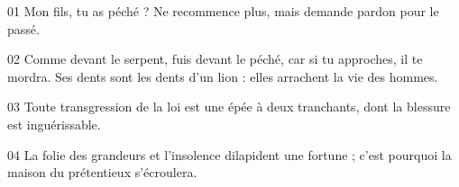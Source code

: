 01 Mon fils, tu as péché ? Ne recommence plus, mais demande pardon pour le passé.

02 Comme devant le serpent, fuis devant le péché, car si tu approches, il te mordra. Ses dents sont les dents d’un lion : elles arrachent la vie des hommes.

03 Toute transgression de la loi est une épée à deux tranchants, dont la blessure est inguérissable.

04 La folie des grandeurs et l’insolence dilapident une fortune ; c’est pourquoi la maison du prétentieux s’écroulera.
